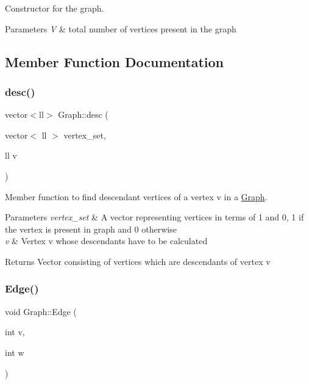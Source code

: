 Constructor for the graph. 


\begin{DoxyParams}{Parameters}
{\em V} & total number of vertices present in the graph \\
\hline
\end{DoxyParams}


\subsection{Member Function Documentation}
\mbox{\label{classGraph_a322040982fd02ab16e2a70b0f9c6758a}} 
\subsubsection{\texorpdfstring{desc()}{desc()}}
{\footnotesize\ttfamily vector$<$ll$>$ Graph\+::desc (\begin{DoxyParamCaption}\item[{vector$<$ ll $>$}]{vertex\+\_\+set,  }\item[{ll}]{v }\end{DoxyParamCaption})\hspace{0.3cm}{\ttfamily [inline]}}



Member function to find descendant vertices of a vertex v in a \hyperlink{classGraph}{Graph}. 


\begin{DoxyParams}{Parameters}
{\em vertex\+\_\+set} & A vector representing vertices in terms of 1 and 0, 1 if the vertex is present in graph and 0 otherwise \\
\hline
{\em v} & Vertex v whose descendants have to be calculated \\
\hline
\end{DoxyParams}
\begin{DoxyReturn}{Returns}
Vector consisting of vertices which are descendants of vertex v 
\end{DoxyReturn}
\mbox{\label{classGraph_ab180d5a83c57804753fe55717377c03d}} 
\subsubsection{\texorpdfstring{Edge()}{Edge()}}
{\footnotesize\ttfamily void Graph\+::\+Edge (\begin{DoxyParamCaption}\item[{int}]{v,  }\item[{int}]{w }\end{DoxyParamCaption})}



